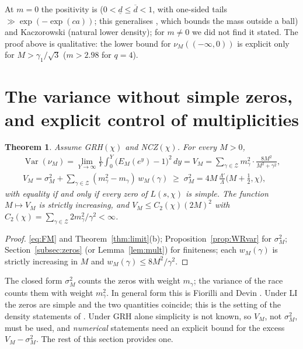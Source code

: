 \documentclass[11pt]{amsart}
\newtheorem{theorem}{Theorem}[section]
\theoremstyle{definition}
\numberwithin{equation}{section}
\newcommand{\cZ}{\mathcal Z}          %
\newcommand{\dlow}{\underline{d}}
\newcommand{\dup}{\overline{d}}
\begin{document}
At $m=0$ the positivity is \cite[Theorem~2.5(1)]{Dev20}
($0<\dlow\le\dup<1$, with one-sided tails $\gg\exp(-\exp(ca))$; this
generalises \cite[Theorem~1.2]{RS94}, which bounds the mass outside a
ball) and Kaczorowski \cite{Kac93} (natural lower density); for
$m\ne0$ we did not find it stated. The proof above is qualitative:
the lower bound for $\nu_M((-\infty,0))$ is explicit only for
$M>\gamma_1/\sqrt3$ ($m>2.98$ for $q=4$).

\section{The variance without simple zeros, and explicit control of
multiplicities}\label{sec:variance}

\begin{theorem}\label{thm:var}
Assume GRH$(\chi)$ and NCZ$(\chi)$. For every $M>0$,
\begin{gather*}
\operatorname{Var}(\nu_M)
=\lim_{Y\to\infty}\frac1Y\int_0^Y\bigl(E_M(e^y)-1\bigr)^2\,dy
=V_M=\sum_{\gamma\in\cZ}m_\gamma^2\cdot\frac{8M^2}{M^2+\gamma^2},\\
V_M=\sigma_M^2+\sum_{\gamma\in\cZ}(m_\gamma^2-m_\gamma)\,w_M(\gamma)
\;\ge\;\sigma_M^2=4M\,\frac{\Lambda'}{\Lambda}\bigl(M+\tfrac12,\chi\bigr),
\end{gather*}
with equality if and only if every zero of $L(s,\chi)$ is simple.
The function $M\mapsto V_M$ is strictly increasing, and
$V_M\le C_2(\chi)(2M)^2$ with
$C_2(\chi)=\sum_{\gamma\in\cZ}2m_\gamma^2/\gamma^2<\infty$.
\end{theorem}

\begin{proof}
\eqref{eq:FM} and Theorem~\ref{thm:limit}(b);
Proposition~\ref{prop:WRvar} for $\sigma_M^2$;
Section~\ref{subsec:zeros} (or Lemma~\ref{lem:mult}) for finiteness;
each $w_M(\gamma)$ is strictly increasing in $M$ and
$w_M(\gamma)\le8M^2/\gamma^2$.
\end{proof}

The closed form $\sigma_M^2$ counts the zeros with weight $m_\gamma$;
the variance of the race counts them with weight $m_\gamma^2$. In
general form this is Fiorilli \cite[Lemma~2.5]{Fio14} and Devin
\cite[Theorem~2.1]{Dev20}. Under LI the zeros are simple and the two
quantities coincide; this is the setting of the density statements of
\cite{WR}. Under GRH alone simplicity is not known, so $V_M$, not
$\sigma_M^2$, must be used, and \emph{numerical} statements need an
explicit bound for the excess $V_M-\sigma_M^2$. The rest of this
section provides one.
\end{document}
